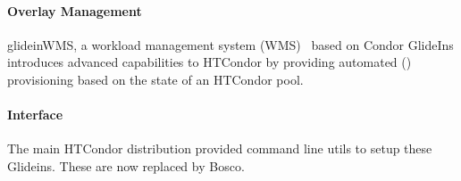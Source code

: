 \documentclass{sig-alternate}
\begin{document}
\paragraph{Overlay Management}

glideinWMS, a workload management system (WMS)~\cite{1742-6596-119-6-062044}
based on Condor GlideIns introduces advanced \pilotjob capabilities to HTCondor
by providing automated \pilot () provisioning based on the state
of an HTCondor pool.


\paragraph{Interface}

The main HTCondor distribution provided command line utils to setup these
Glideins. These are now replaced by Bosco.
%
\end{document}
